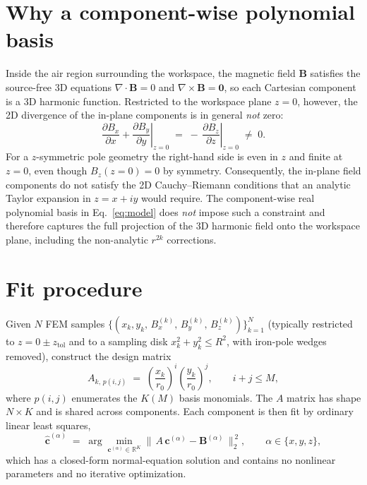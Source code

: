 \documentclass[11pt]{article}
\begin{document}
\section{Why a component-wise polynomial basis}
\label{sec:why}

Inside the air region surrounding the workspace, the magnetic field
$\mathbf{B}$ satisfies the source-free 3D equations
$\nabla \cdot \mathbf{B} = 0$ and
$\nabla \times \mathbf{B} = \mathbf{0}$,
so each Cartesian component is a 3D harmonic function.
Restricted to the workspace plane $z = 0$, however, the 2D divergence
of the in-plane components is in general \emph{not} zero:
%
\begin{equation}
\label{eq:divxy}
\left.\frac{\partial B_x}{\partial x}
   + \frac{\partial B_y}{\partial y}\right|_{z=0}
\;=\; -\,\left.\frac{\partial B_z}{\partial z}\right|_{z=0}
\;\neq\; 0.
\end{equation}
%
For a $z$-symmetric pole geometry the right-hand side is even in $z$
and finite at $z = 0$, even though $B_z(z = 0) = 0$ by symmetry.
Consequently, the in-plane field components do not satisfy the 2D
Cauchy--Riemann conditions that an analytic Taylor expansion in
$z = x + i y$ would require. The component-wise real polynomial
basis in Eq.~\eqref{eq:model} does \emph{not} impose such a
constraint and therefore captures the full projection of the 3D
harmonic field onto the workspace plane, including the non-analytic
$r^{2k}$ corrections.

\section{Fit procedure}
\label{sec:fit}

Given $N$ FEM samples
$\{(x_k, y_k,\, B_x^{(k)},\, B_y^{(k)},\, B_z^{(k)})\}_{k=1}^{N}$
(typically restricted to $z = 0 \pm z_{\text{tol}}$ and to a sampling
disk $x_k^{2} + y_k^{2} \le R^{2}$, with iron-pole wedges removed),
construct the design matrix
%
\begin{equation}
A_{k,\,p(i,j)}
\;=\; \left(\frac{x_k}{r_0}\right)^{i}
      \left(\frac{y_k}{r_0}\right)^{j},
\qquad i + j \le M,
\end{equation}
%
where $p(i,j)$ enumerates the $K(M)$ basis monomials. The $A$ matrix
has shape $N \times K$ and is shared across components. Each
component is then fit by ordinary linear least squares,
%
\begin{equation}
\label{eq:lstsq}
\hat{\mathbf{c}}^{(\alpha)}
\;=\; \arg\min_{\mathbf{c}^{(\alpha)} \in \mathbb{R}^{K}}
      \big\|\, A\, \mathbf{c}^{(\alpha)} - \mathbf{B}^{(\alpha)} \,\big\|_{2}^{\,2},
\qquad \alpha \in \{x, y, z\},
\end{equation}
%
which has a closed-form normal-equation solution and contains no
nonlinear parameters and no iterative optimization.
\end{document}
